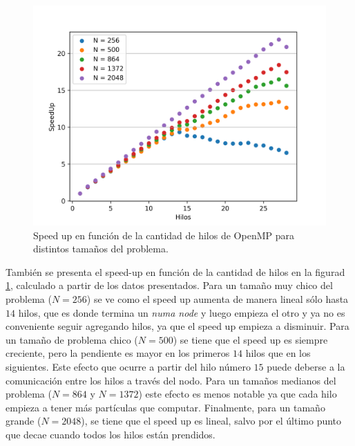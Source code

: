 \documentclass[a4paper,spanish,12pt,twoside]{article}
\begin{document}
\begin{figure}[h!]
	\centering
	\includegraphics[width=.8\textwidth]{3-omp-speedup.png}
	\caption{Speed up en función de la cantidad de hilos de OpenMP para distintos tamaños del problema.}\label{fig:omp-speedup}
\end{figure}
También se presenta el speed-up en función de la cantidad de hilos en la figurad \ref{fig:omp-speedup}, calculado a partir de los datos presentados. Para un tamaño muy chico del problema ($N=256$) se ve como el speed up aumenta de manera lineal sólo hasta $14$ hilos, que es donde termina un \textit{numa node} y luego empieza el otro y ya no es conveniente seguir agregando hilos, ya que el speed up empieza a disminuir. Para un tamaño de problema chico ($N=500$) se tiene que el speed up es siempre creciente, pero la pendiente es mayor en los primeros $14$ hilos que en los siguientes. Este efecto que ocurre a partir del hilo número $15$ puede deberse a la comunicación entre los hilos a través del nodo. Para un tamaños medianos del problema ($N=864$ y $N=1372$) este efecto es menos notable ya que cada hilo empieza a tener más partículas que computar. Finalmente, para un tamaño grande ($N = 2048$), se tiene que el speed up es lineal, salvo por el último punto que decae cuando todos los hilos están prendidos.
\end{document}
